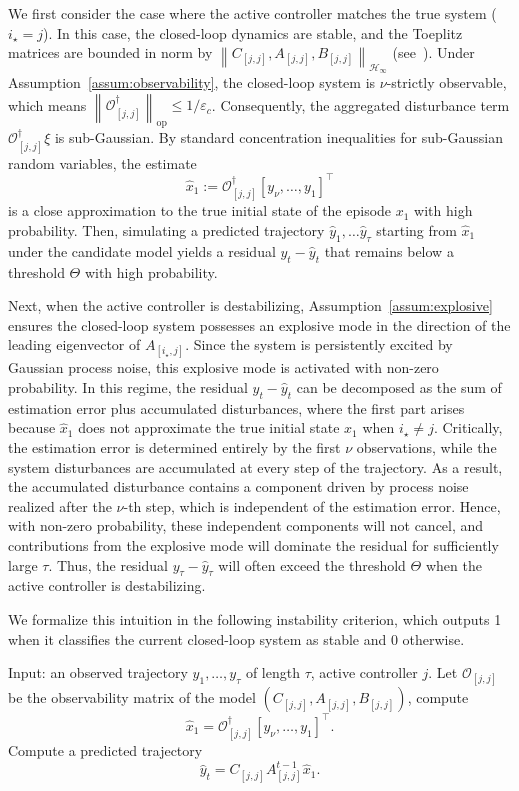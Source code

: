 \documentclass[11pt, twoside]{article}
\makeatletter
\newcounter{criteria}
\renewcommand{\thecriteria}{\arabic{criteria}}
\newenvironment{algcriteria}[1][htb]{\renewcommand{\ALG@name}{Criterion}\renewcommand{\thealgorithm}{\thecriteria}\refstepcounter{criteria}\begin{algorithm}[#1]}{\end{algorithm}}
\theoremstyle{definition}
\newcommand{\norm}[1]{\left\lVert #1 \right\rVert}
\newcommand{\opnorm}[1]{\norm{#1}_{\mathrm{op}}}
\newcommand{\hinfnorm}[1]{\norm{#1}_{\mathcal{H}_\infty}}
\makeatother
\begin{document}
We first consider the case where the active controller matches the true system ($i_\star = j$).
In this case, the closed-loop dynamics are stable, and the Toeplitz matrices are bounded in norm by $\hinfnorm{C_{[j, j]}, A_{[j, j]}, B_{[j, j]}}$ (see~\cite{tilli1998singular}).
Under Assumption~\ref{assum:observability}, the closed-loop system is $\nu$-strictly observable, which means $\opnorm{\mathcal{O}_{[j, j]}^\dagger} \le 1/\varepsilon_c$.
Consequently, the aggregated disturbance term $\mathcal{O}_{[j, j]}^\dagger \xi$ is sub-Gaussian.
By standard concentration inequalities for sub-Gaussian random variables, the estimate 
\[ \hat{x}_1 := \mathcal{O}_{[j, j]}^\dagger[y_\nu, \dots, y_1]^\top\] 
is a close approximation to the true initial state of the episode $x_1$ with high probability.
Then, simulating a predicted trajectory $\hat{y}_1, \dots \hat{y}_\tau$ starting from $\hat{x}_1$ under the candidate model yields a residual $y_t - \hat{y}_t$ that remains below a threshold $\Theta$ with high probability.

Next, when the active controller is destabilizing, Assumption~\ref{assum:explosive} ensures the closed-loop system possesses an explosive mode in the direction of the leading eigenvector of $A_{[i_\star, j]}$.
Since the system is persistently excited by Gaussian process noise, this explosive mode is activated with non-zero probability.
In this regime, the residual $y_t - \hat{y}_t$ can be decomposed as the sum of estimation error plus accumulated disturbances, where the first part arises because $\hat{x}_1$ does not approximate the true initial state $x_1$ when $i_\star \neq j$.
Critically, the estimation error is determined entirely by the first $\nu$ observations, while the system disturbances are accumulated at every step of the trajectory.
As a result, the accumulated disturbance contains a component driven by process noise realized after the $\nu$-th step, which is independent of the estimation error.
Hence, with non-zero probability, these independent components will not cancel, and contributions from the explosive mode will dominate the residual for sufficiently large $\tau$.
Thus, the residual $y_\tau - \hat{y}_\tau$ will often exceed the threshold $\Theta$ when the active controller is destabilizing.

We formalize this intuition in the following instability criterion, which outputs 1 when it classifies the current closed-loop system as stable and 0 otherwise.
\begin{algcriteria}
\begin{algorithmic}[1]
    \State Input: an observed trajectory $y_1, \dots, y_\tau$ of length $\tau$, active controller $j$.
    \State Let $\mathcal{O}_{[j,j]}$ be the observability matrix of the model $(C_{[j,j]}, A_{[j,j]}, B_{[j,j]})$, compute
    \[\hat{x}_1 = \mathcal{O}_{[j,j]}^\dagger [y_\nu, \dots, y_1]^\top.\]
    \State Compute a predicted trajectory
    \[\hat{y}_{t} = C_{[j,j]} A_{[j,j]}^{t-1} \hat{x}_1.\]
\If{$\norm{y_{\tau} - \hat{y}_{\tau}} > \sqrt{2d_y \Theta\log(2d_y/\delta_1})$} 
\Else {} 
    \EndIf
\end{algorithmic}
\caption{Instability detection criterion $S^{(1)}$}
\label{alg:instability}
\end{algcriteria}
\end{document}
